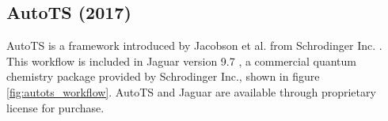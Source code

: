 \documentclass[preprint, 11pt]{elsarticle} %
\begin{document}

\clearpage


\subsection{AutoTS (2017)}

AutoTS is a framework introduced by Jacobson et al. from Schrodinger Inc. \cite{jacobson:2017}. 
This workflow is included in Jaguar version 9.7 \cite{Jaguar:2013}, a commercial quantum chemistry package provided by Schrodinger Inc., shown in figure \ref{fig:autots_workflow}.
AutoTS and Jaguar are available through proprietary license for purchase.
\end{document}
